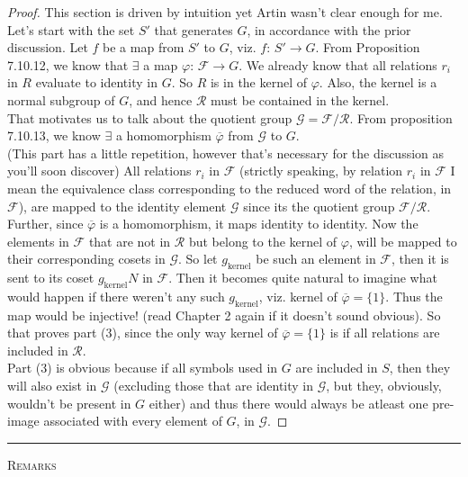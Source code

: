 \documentclass[12pt]{article}
\begin{document}
\begin{proof}
This section is driven by intuition yet Artin wasn't clear enough for me.\\
Let's start with the set $S'$ that generates $G$, in accordance with the prior discussion. Let $f$ be a map from $S'$ to $G$, viz. $f:\,S' \rightarrow G$. From Proposition 7.10.12, we know that $\exists$ a map $\varphi : \, \mathcal F \rightarrow G$. We already know that all relations $r_{i}$ in $R$ evaluate to identity in $G$. So $R$ is in the kernel of $\varphi$. Also, the kernel is a normal subgroup of $G$, and hence $\mathcal R$ must be contained in the kernel.\\
That motivates us to talk about the quotient group $\mathcal {G = F/R}$. From proposition 7.10.13, we know $\exists$ a homomorphism $\overline \varphi$ from $\mathcal G$ to $G$.\\
(This part has a little repetition, however that's necessary for the discussion as you'll soon discover) All relations $r_{i}$ in $\mathcal F$ (strictly speaking, by relation $r_{i}$ in $\mathcal F$ I mean the equivalence class corresponding to the reduced word of the relation, in $\mathcal F$), are mapped to the identity element $\mathcal G$ since its the quotient group $\mathcal {F/R}$. Further, since $\overline \varphi$ is a homomorphism, it maps identity to identity. Now the elements in $\mathcal F$ that are not in $\mathcal R$ but belong to the kernel of $\varphi$, will be mapped to their corresponding cosets in $\mathcal G$. So let $g_{\text{kernel}}$ be such an element in $\mathcal F$, then it is sent to its coset $g_{\text {kernel}}N$ in $\mathcal F$. Then it becomes quite natural to imagine what would happen if there weren't any such $g_{\text {kernel}}$, viz. kernel of $\overline \varphi = \{1\}$. Thus the map would be injective! (read Chapter 2 again if it doesn't sound obvious). So that proves part (3), since the only way kernel of $\overline \varphi = \{1\}$ is if all relations are included in $\mathcal R$.\\
Part (3) is obvious because if all symbols used in $G$ are included in $S$, then they will also exist in $\mathcal G$ (excluding those that are identity in $\mathcal G$, but they, obviously, wouldn't be present in $G$ either) and thus there would always be atleast one pre-image associated with every element of $G$, in $\mathcal G$.
\end{proof}

\vspace{500pt}
\hrule
\vspace{12pt}
\begin{center}
{\textsc {Remarks}}
\end{center}
\end{document}
